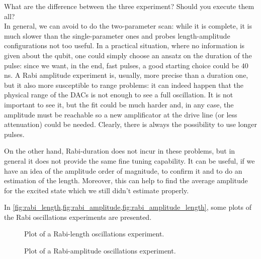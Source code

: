 What are the difference between the three experiment? Should you execute them all?\\
In general, we can avoid to do the two-parameter scan: while it is complete, it is much slower than the single-parameter ones and probes length-amplitude configurations not too useful.
In a practical situation, where no information is given about the qubit, one could simply choose an ansatz on the duration of the pulse: since we want, in the end, fast pulses, a good starting choice could be $40$ ns.
A Rabi amplitude experiment is, usually, more precise than a duration one, but it also more susceptible to range problems: it can indeed happen that the physical range of the DACs is not enough to see a full oscillation.
It is not important to see it, but the fit could be much harder and, in any case, the \pipulse amplitude must be reachable so a new amplificator at the drive line (or less attenuation) could be needed.
Clearly, there is always the possibility to use longer pulses.

On the other hand, Rabi-duration does not incur in these problems, but in general it does not provide the same fine tuning capability.
It can be useful, if we have an idea of the amplitude order of magnitude, to confirm it and to do an estimation of the length.
Moreover, this can help to find the average amplitude for the excited state which we still didn't estimate properly.

In \cref{fig:rabi_length,fig:rabi_amplitude,fig:rabi_amplitude_length}, some plots of the Rabi oscillations experiments are presented.

\begin{figure}[ht]
    \caption{Plot of a Rabi-length oscillations experiment.}
    \label{fig:rabi_length}
\end{figure}

\begin{figure}[ht]
    \caption{Plot of a Rabi-amplitude oscillations experiment.}
    \label{fig:rabi_amplitude}
\end{figure}



